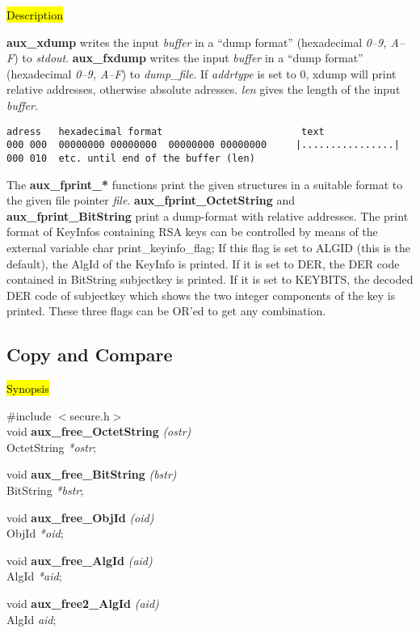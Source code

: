 \hl{Description}

{\bf aux\_xdump} writes the input {\em buffer} in a
``dump format'' (hexadecimal {\em 0--9, A--F}) to {\em stdout}.
{\bf aux\_fxdump} writes the input {\em buffer} in a
``dump format'' (hexadecimal {\em 0--9, A--F}) to {\em dump\_file}.
If {\em addrtype} is set to 0, xdump will print relative addresses,
otherwise absolute adresses.
{\em len} gives the length of the input {\em buffer}.

{\small
\begin{verbatim}
adress   hexadecimal format                        text
000 000  00000000 00000000  00000000 00000000     |................|
000 010  etc. until end of the buffer (len)
\end{verbatim}
}

The {\bf aux\_fprint\_*} functions print the given structures in a suitable
format to the given file pointer {\em file}. {\bf aux\_fprint\_OctetString}
and {\bf aux\_fprint\_BitString} print a dump-format with relative addresses. 
The print format of KeyInfos
containing RSA keys can be controlled by means of the external variable
\bc
{\small
char print\_keyinfo\_flag;
}
\ec
If this flag is set to ALGID (this is the default), the AlgId of the KeyInfo
is printed. If it is set to DER, the DER code contained in BitString subjectkey  
is printed. If it is set to KEYBITS, the decoded DER code of
subjectkey which shows the two integer components of the key is printed. These three
flags can be OR'ed to get any combination.

\subsection{Copy and Compare}
\label{aux_free}
\hl{Synopsis}

\#include $<$secure.h$>$ \\
void {\bf aux\_free\_OctetString} {\em (ostr)} \\
OctetString {\em **ostr};

void {\bf aux\_free\_BitString} {\em (bstr)} \\
BitString {\em **bstr};

void {\bf aux\_free\_ObjId} {\em (oid)} \\
ObjId {\em **oid};

void {\bf aux\_free\_AlgId} {\em (aid)} \\
AlgId {\em **aid};

void {\bf aux\_free2\_AlgId} {\em (aid)} \\
AlgId {\em *aid};

